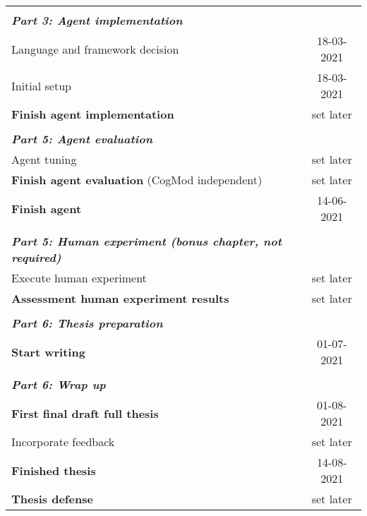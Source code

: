 \begin{longtable}{l @{\extracolsep{\fill}} c}
         & \\
        \textit{\textbf{Part 3: Agent implementation}} &  \\ 
        Language and framework decision & 18-03-2021           \\\hdashline[1pt/10pt] 
        Initial setup & 18-03-2021           \\\hdashline[1pt/10pt] 
        \textbf{Finish agent implementation}    & set later           \\\hdashline[1pt/10pt] 
        
         & \\
        \textit{\textbf{Part 5: Agent evaluation}} &  \\ 
        Agent tuning & set later  \\ \hdashline[1pt/10pt] 
        \textbf{Finish agent evaluation} (CogMod independent)   & set later          \\\hdashline[1pt/10pt] 
        \textbf{Finish agent}    & 14-06-2021           \\\hdashline[1pt/10pt] 

         & \\
        \textit{\textbf{Part 5: Human experiment (bonus chapter, not required)}} &                          \\ 
        Execute human experiment    & set later                               \\\hdashline[1pt/10pt] 
        \textbf{Assessment human experiment results}    & set later           \\\hdashline[1pt/10pt] 
        
         & \\
        \textit{\textbf{Part 6: Thesis preparation}} &  \\ 
        \textbf{Start writing}    & 01-07-2021           \\\hdashline[1pt/10pt] 
        
         
         & \\
        \textit{\textbf{Part 6: Wrap up}} &  \\ 
        \textbf{First final draft full thesis}    & 01-08-2021           \\\hdashline[1pt/10pt]
        Incorporate feedback    & set later           \\\hdashline[1pt/10pt] 
        \textbf{Finished thesis}    & 14-08-2021           \\\hdashline[1pt/10pt] 
        \textbf{Thesis defense}    & set later           \\\bottomrule
    \end{longtable}
\endgroup